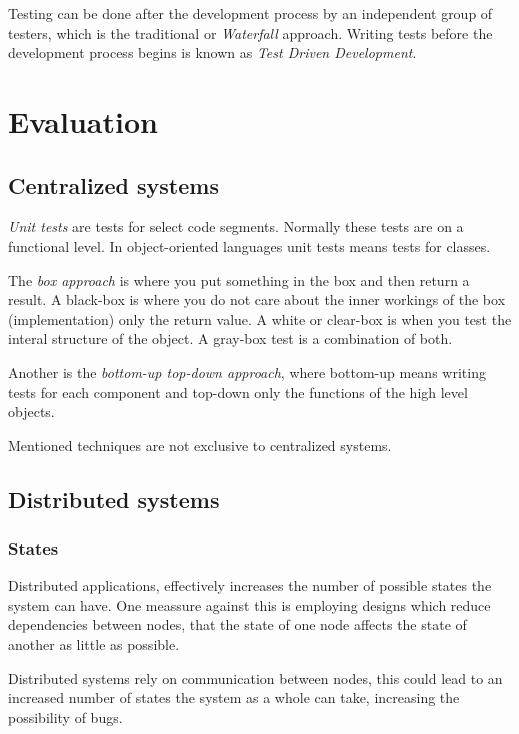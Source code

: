 \documentclass[10pt]{sensys-abstract}
\begin{document}
Testing can be done after the development process by an independent group of testers, which is the traditional or \emph{Waterfall} approach. Writing tests before the development process begins is known as \emph{Test Driven Development}.

\section{Evaluation}

\subsection{Centralized systems} \noindent

\emph{Unit tests} are tests for select code segments. Normally these tests are on a functional level. In object-oriented languages unit tests means tests for classes. 

The \emph{box approach} is where you put something in the box and then return a result. A black-box is where you do not care about the inner workings of the box (implementation) only the return value. A white or clear-box is when you test the interal structure of the object. A gray-box test is a combination of both.

Another is the \emph{bottom-up top-down approach}, where bottom-up means writing tests for each component and top-down only the functions of the high level objects.

Mentioned techniques are not exclusive to centralized systems.
\subsection{Distributed systems}

\subsubsection{States}\noindent
Distributed applications, effectively increases the number of possible states the system can have. One meassure against this is employing designs which reduce dependencies between nodes, that the state of one node affects the state of another as little as possible.

Distributed systems rely on communication between nodes, this could lead to an increased number of states the system as a whole can take, increasing the possibility of bugs.\cite{Rikitake:2011:2034654} %
\end{document}

